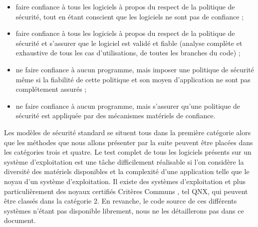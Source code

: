 \documentclass[pdftex,a4paper,titlepage,11pt]{article}
\begin{document}
\begin{itemize}
  \item faire confiance à tous les logiciels à propos du respect de la politique de sécurité, tout en étant conscient que les logiciels ne sont pas de confiance ;%
  \item faire confiance à tous les logiciels à propos du respect de la politique de sécurité et s'assurer que le logiciel est validé et fiable (analyse complète et exhaustive de tous les cas d'utilisations, de toutes les branches du code) ;%
  \item ne faire confiance à aucun programme, mais imposer une politique de sécurité même si la fiabilité de cette politique et son moyen d'application ne sont pas complétement assurés ;%
  \item ne faire confiance à aucun programme, mais s'assurer qu'une politique de sécurité est appliquée par des mécanismes matériels de confiance.%
\end{itemize}

Les modèles de sécurité standard se situent tous dans la première catégorie alors que les méthodes que nous allons présenter par la suite peuvent être placées dans les catégories trois et quatre. Le test complet de tous les logiciels présents sur un système d'exploitation est une tâche difficilement réalisable si l'on considère la diversité des matériels disponibles et la complexité d'une application telle que le noyau d'un système d'exploitation. Il existe des systèmes d'exploitation et plus particulièrement des noyaux certifiés Critères Communs \cite{CCCERT}, tel QNX\cite{QNX}, qui peuvent être classés dans la catégorie 2. En revanche, le code source de ces différents systèmes n'étant pas disponible librement, nous ne les détaillerons pas dans ce document.


\end{document}

